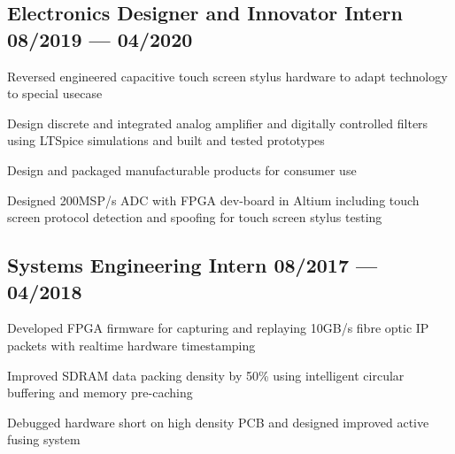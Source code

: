 \documentclass[letter,10pt]{article}
\begin{document}
\subsection{{Electronics Designer and Innovator Intern \hfill 08/2019 --- 04/2020}}
\begin{zitemize}
\item Reversed engineered capacitive touch screen stylus hardware to adapt technology to special usecase
\item Design discrete and integrated analog amplifier and digitally controlled filters using LTSpice simulations and built and tested prototypes
\item Design and packaged manufacturable products for consumer use
\item Designed 200MSP/s ADC with FPGA dev-board in Altium including touch screen protocol detection and spoofing for touch screen stylus testing
\end{zitemize}
{\color{sectiondivide} \vspace{-0.75em}\hrulefill}

\subsection{{Systems Engineering Intern \hfill 08/2017 --- 04/2018}}
\begin{zitemize}
\item Developed FPGA firmware for capturing and replaying 10GB/s fibre optic IP packets with realtime hardware timestamping
\item Improved SDRAM data packing density by 50\% using intelligent circular buffering and memory pre-caching
\item Debugged hardware short on high density PCB and designed improved active fusing system
\end{zitemize}
\end{document}
